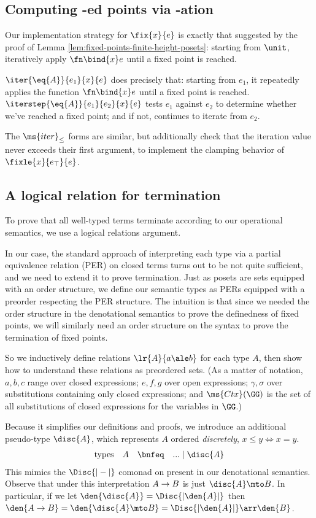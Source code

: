 
\subsection{Computing -ed points via -ation}

Our implementation strategy for $\fix{x}{e}$ is exactly that suggested by the
proof of Lemma \ref{lem:fixed-points-finite-height-posets}: starting from
$\unit$, iteratively apply $\fn\bind{x} e$ until a fixed point is
reached.

$\iter{\eq{A}}{e_1}{x}{e}$ does precisely that: starting from $e_1$, it
repeatedly applies the function $\fn\bind{x}e$ until a fixed point is reached.
$\iterstep{\eq{A}}{e_1}{e_2}{x}{e}$ tests $e_1$ against $e_2$ to determine
whether we've reached a fixed point; and if not, continues to iterate from
$e_2$.

The $\ms{iter}_\le$ forms are similar, but additionally check that the iteration
value never exceeds their first argument, to implement the clamping behavior of
$\fixle{x}{e_\top}{e}$.


\subsection{A logical relation for termination}

To prove that all well-typed terms terminate according to our operational
semantics, we use a logical relations argument.

In our case, the standard approach of interpreting each type via a
partial equivalence relation (PER) on closed terms turns out to be not
quite sufficient, and we need to extend it to prove termination. Just
as posets are sets equipped with an order structure, we define our
semantic types as PERs equipped with a preorder respecting the
PER structure. The intuition is that since we needed the order
structure in the denotational semantics to prove the definedness of
fixed points, we will similarly need an order structure on the syntax
to prove the termination of fixed points.

So we inductively define relations $\lr{A}{a \ale b}$ for each
type $A$, then show how to understand these relations as preordered
sets.  (As a matter of notation, $a,b,c$ range over closed expressions;
$e,f,g$ over open expressions; $\gamma, \sigma$ over substitutions
containing only closed expressions; and $\ms{Ctx}(\GG)$ is the set of
all substitutions of closed expressions for the variables in $\GG$.)

Because it simplifies our definitions and proofs, we introduce an additional
pseudo-type $\disc{A}$, which represents $A$ ordered \emph{discretely}, $x \le y
\iff x = y$.
\[\begin{array}{rccl}
  \text{types} &
  A &\bnfeq& ... \pipe \disc{A}
\end{array}\]
This mimics the $\Disc{\U{-}}$ comonad on \cPoset{} present in our denotational
semantics. Observe that under this interpretation $A \to B$ is just $\disc{A}
\mto B$. In particular, if we let $\den{\disc{A}} = \Disc{|\den{A}|}$ then
$\den{A \uto B} = \den{\disc{A} \mto B} = \Disc{|\den{A}|} \arr \den{B}$.

